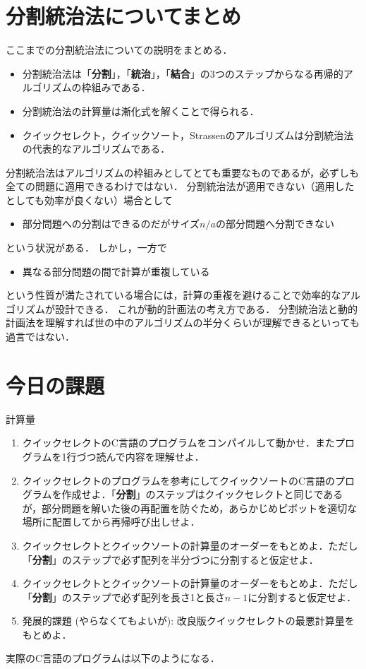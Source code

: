 \documentclass[a4paper,twoside,onecolumn,openany,article]{memoir}
\theoremstyle{remark}
\begin{document}
\section{分割統治法についてまとめ}
ここまでの分割統治法についての説明をまとめる．
\begin{itemize}
\item 分割統治法は「\textbf{分割}」，「\textbf{統治}」，「\textbf{結合}」の3つのステップからなる再帰的アルゴリズムの枠組みである．
\item 分割統治法の計算量は漸化式を解くことで得られる．
\item クイックセレクト，クイックソート，Strassenのアルゴリズムは分割統治法の代表的なアルゴリズムである．
\end{itemize}
分割統治法はアルゴリズムの枠組みとしてとても重要なものであるが，必ずしも全ての問題に適用できるわけではない．
分割統治法が適用できない（適用したとしても効率が良くない）場合として
\begin{itemize}
\item 部分問題への分割はできるのだがサイズ$n/a$の部分問題へ分割できない
\end{itemize}
という状況がある．
しかし，一方で
\begin{itemize}
\item 異なる部分問題の間で計算が重複している
\end{itemize}
という性質が満たされている場合には，計算の重複を避けることで効率的なアルゴリズムが設計できる．
これが動的計画法の考え方である．
分割統治法と動的計画法を理解すれば世の中のアルゴリズムの半分くらいが理解できるといっても過言ではない．

\section{今日の課題}
計算量
\begin{enumerate}
\item クイックセレクトのC言語のプログラムをコンパイルして動かせ．またプログラムを1行づつ読んで内容を理解せよ．
\item クイックセレクトのプログラムを参考にしてクイックソートのC言語のプログラムを作成せよ．「\textbf{分割}」のステップはクイックセレクトと同じであるが，部分問題を解いた後の再配置を防ぐため，あらかじめピボットを適切な場所に配置してから再帰呼び出しせよ．
\item クイックセレクトとクイックソートの計算量のオーダーをもとめよ．ただし「\textbf{分割}」のステップで必ず配列を半分づつに分割すると仮定せよ．
\item クイックセレクトとクイックソートの計算量のオーダーをもとめよ．ただし「\textbf{分割}」のステップで必ず配列を長さ1と長さ$n-1$に分割すると仮定せよ．
\item 発展的課題 (やらなくてもよいが): 改良版クイックセレクトの最悪計算量をもとめよ．
\end{enumerate}
実際のC言語のプログラムは以下のようになる．

\end{document}
